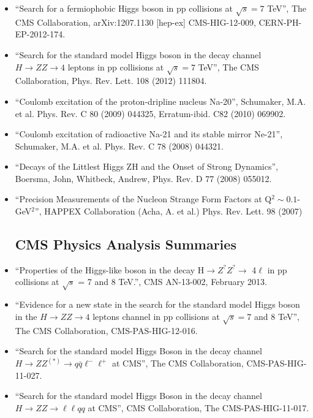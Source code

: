 \documentclass[12pt,oneside,final]{thesis}
\begin{document}
\begin{vita}
\begin{itemize}
\item ``Search for a fermiophobic Higgs boson in pp collisions at $\sqrt{s}=7$ TeV'', The CMS Collaboration, arXiv:1207.1130 [hep-ex] CMS-HIG-12-009, CERN-PH-EP-2012-174.

\item ``Search for the standard model Higgs boson in the decay channel $H \to ZZ \to 4$ leptons in pp collisions at $\sqrt{s} = 7$ TeV'', The CMS Collaboration, Phys. Rev. Lett. 108 (2012) 111804. 

\item ``Coulomb excitation of the proton-dripline nucleus Na-20'', Schumaker, M.A. et al. Phys. Rev. C 80 (2009) 044325, Erratum-ibid. C82 (2010) 069902.

\item ``Coulomb excitation of radioactive Na-21 and its stable mirror Ne-21'', Schumaker, M.A. et al. Phys. Rev. C 78 (2008) 044321. 

\item ``Decays of the Littlest Higgs ZH and the Onset of Strong Dynamics'', Boersma, John, Whitbeck, Andrew, Phys. Rev. D 77 (2008) 055012.

\item ``Precision Measurements of the Nucleon Strange Form Factors at Q$^2\sim 0.1$-GeV$^2$'', HAPPEX Collaboration (Acha, A. et al.) Phys. Rev. Lett. 98 (2007)

\subsection*{CMS Physics Analysis Summaries}

\item ``Properties of the Higgs-like boson in the decay H$\to Z^? Z^?\to$ 4$\ell$ in pp collisions at $\sqrt{s}$ = 7 and 8 TeV.'', CMS AN-13-002, February 2013.

\item ``Evidence for a new state in the search for the standard model Higgs boson in the $H \to ZZ \to 4$ leptons channel in pp collisions at $\sqrt{s} = $7 and 8 TeV'', The CMS Collaboration, CMS-PAS-HIG-12-016.

\item ``Search for the standard model Higgs Boson in the decay channel $H \to ZZ^{(*)} \to q \bar{q} \ell^-\ell^+$ at CMS'', The CMS Collaboration, CMS-PAS-HIG-11-027.

\item ``Search for the standard model Higgs Boson in the decay channel $H \to ZZ \to \ell\ell qq$ at CMS'', CMS Collaboration, The CMS-PAS-HIG-11-017.


\end{itemize}
\end{vita}
\end{document}
